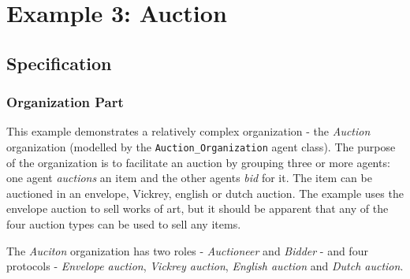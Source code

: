 
\section{Example 3: Auction}

\subsection*{Specification}

\subsubsection*{Organization Part}

This example demonstrates a relatively complex organization - the \textit{Auction} organization (modelled by the \texttt{Auction\_Organization} agent class).
The purpose of the organization is to facilitate an auction by grouping three or more agents: one agent \textit{auctions} an item and the other agents \textit{bid} for it.
The item can be auctioned in an envelope, Vickrey, english or dutch auction.
The example uses the envelope auction to sell works of art, but it should be apparent that any of the four auction types can be used to sell any items.

The \textit{Auciton} organization has two roles - \textit{Auctioneer} and \textit{Bidder} - and four protocols - \textit{Envelope auction}, \textit{Vickrey auction}, \textit{English auction} and \textit{Dutch auction}.

